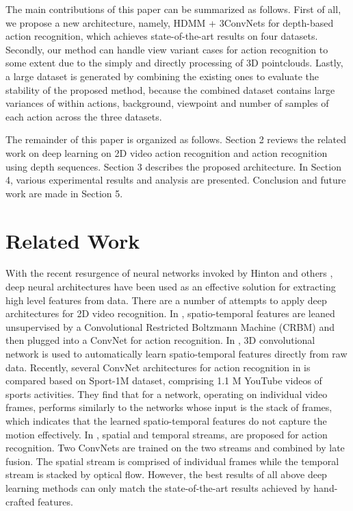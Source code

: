 \documentclass[conference]{IEEEtran}
\begin{document}
The main contributions of this paper can be summarized as follows. First of all, we propose a new architecture, namely, HDMM + 3ConvNets for depth-based action recognition, which achieves state-of-the-art results on four datasets. Secondly, our method can handle view variant cases for action recognition to some extent due to the simply and directly processing of 3D pointclouds. Lastly, a large dataset is generated by combining the existing ones to evaluate the stability of the proposed method, because the combined dataset contains large variances of within actions, background, viewpoint and number of samples of each action across the three datasets.

The remainder of this paper is organized as follows. Section 2 reviews the related work on deep learning on 2D video action recognition and action recognition using depth sequences. Section 3 describes the proposed architecture. In Section 4, various experimental results and analysis are presented. Conclusion and future work are made in Section 5.

\section{Related Work}
With the recent resurgence of neural networks invoked by Hinton and others \cite{hinton2006fast}, deep neural architectures have been used as an effective solution for extracting high level features from data. There are a number of attempts to apply deep architectures for 2D video recognition. In \cite{taylor2010convolutional}, spatio-temporal features are leaned unsupervised by a Convolutional Restricted Boltzmann Machine (CRBM) and then plugged into a ConvNet for action recognition. In \cite{ji20133d}, 3D convolutional network is used to automatically learn spatio-temporal features directly from raw data. Recently, several ConvNet architectures for action recognition in \cite{karpathy2014large} is compared based on Sport-1M dataset, comprising 1.1 M YouTube videos of sports activities. They find that for a network, operating on individual video frames, performs similarly to the networks whose input is the stack of frames, which indicates that the learned spatio-temporal features do not capture the motion effectively. In \cite{simonyan2014two}, spatial and temporal streams, are proposed for action recognition. Two ConvNets are trained on the two streams and combined by late fusion. The spatial stream is comprised of individual frames while the temporal stream is stacked by optical flow. However, the best results of all above deep learning methods can only match the state-of-the-art results achieved by hand-crafted features. 
\end{document}
